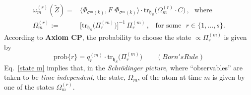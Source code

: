 \documentclass[12pt]{article}
\begin{document}
\begin{align}\label{state m}
\omega_{m}^{(r)}(\tilde{Z})=&  \langle \Phi_{\sigma^{m}({k})}, F\,\, \Phi_{\sigma^{m}({k})} \rangle \cdot 
\text{tr}_{\mathfrak{h}_S}\big(\Omega_{m}^{(r)} \cdot C\big)\,,\,\,\text{ where }\nonumber \\
\Omega_{m}^{(r)}:=&\big[\text{tr}_{\mathfrak{h}_S}\big(\Pi_{r}^{(m)}\big)\big]^{-1}\, \Pi_{r}^{(m)}\,, \,\,\, \text{ for some }\,\, 
r \in \big\{1, \dots, s\big\} .
\end{align}
According to {\bf{Axiom CP}}, the probability to choose the state $\propto \Pi_{r}^{(m)}$ is given by
$$\text{prob}\{r\}= q_{r}^{(m)} \cdot \text{tr}_{\mathfrak{h}_S}\big(\Pi_{r}^{(m)}\big)\qquad (Born's Rule)$$
Eq.~\eqref{state m} implies that, in the \textit{Schr\"odinger picture}, where ``observables'' are taken to 
be \textit{time-independent}, the state, $\Omega_m$, of the atom at time $m$ is given by one of the states 
$\Omega_{m}^{(r)}$. 
\end{document}
